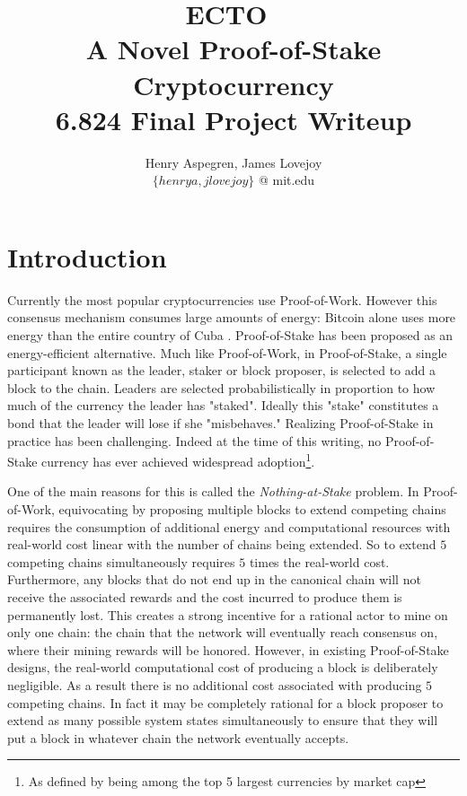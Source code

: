 \documentclass{article}
\newcommand{\coin}{ \textsc{ECTO}\ }
\begin{document}
\title{%
  \coin \\ 
  A Novel Proof-of-Stake Cryptocurrency\\
  \large 6.824 Final Project Writeup}
\author{Henry Aspegren, James Lovejoy \\ $\{ henrya, jlovejoy \}$ @ mit.edu}
\maketitle

\section{Introduction}

Currently the most popular cryptocurrencies use Proof-of-Work. However this consensus mechanism consumes large amounts of energy: Bitcoin alone uses more energy than the entire country of Cuba \cite{energy}. Proof-of-Stake has been proposed as an energy-efficient alternative. Much like Proof-of-Work, in Proof-of-Stake, a single participant known as the leader, staker or block proposer, is selected to add a block to the chain. Leaders are selected probabilistically in proportion to how much of the currency the leader has "staked". Ideally this "stake" constitutes a bond that the leader will lose if she "misbehaves." Realizing Proof-of-Stake in practice has been challenging. Indeed at the time of this writing, no Proof-of-Stake currency has ever achieved widespread adoption\footnote{As defined by being among the top 5 largest currencies by market cap}. 

One of the main reasons for this is called the \textit{Nothing-at-Stake} problem. In Proof-of-Work, equivocating by proposing multiple blocks to extend competing chains requires the consumption of additional energy and computational resources with real-world cost linear with the number of chains being extended. So to extend $ 5 $ competing chains simultaneously requires $ 5 $ times the real-world cost. Furthermore, any blocks that do not end up in the canonical chain will not receive the associated rewards and the cost incurred to produce them is permanently lost. This creates a strong incentive for a rational actor to mine on only one chain: the chain that the network will eventually reach consensus on, where their mining rewards will be honored. However, in existing Proof-of-Stake designs, the real-world computational cost of producing a block is deliberately negligible. As a result there is no additional cost associated with producing $ 5 $ competing chains. In fact it may be completely rational for a block proposer to extend as many possible system states simultaneously to ensure that they will put a block in whatever chain the network eventually accepts. 
\end{document}
